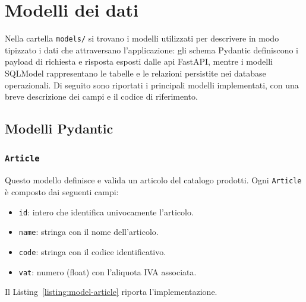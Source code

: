 \section{Modelli dei dati}
\label{sec:code-models}
Nella cartella \texttt{models/} si trovano i modelli utilizzati per descrivere in modo tipizzato i dati che attraversano l’applicazione: gli schema Pydantic definiscono i payload di richiesta e risposta esposti dalle \acrshort{api} FastAPI, mentre i modelli SQLModel rappresentano le tabelle e le relazioni persistite nei database operazionali. Di seguito sono riportati i principali modelli implementati, con una breve descrizione dei campi e il codice di riferimento.
\subsection{Modelli Pydantic}
\subsubsection{\texttt{Article}}
Questo modello definisce e valida un articolo del catalogo prodotti. Ogni \texttt{Article} è composto dai seguenti campi:
\begin{itemize}
    \item \texttt{id}: intero che identifica univocamente l’articolo.
    \item \texttt{name}: stringa con il nome dell’articolo.
    \item \texttt{code}: stringa con il codice identificativo.
    \item \texttt{vat}: numero (float) con l’aliquota IVA associata.
\end{itemize}
Il Listing~\ref{listing:model-article} riporta l’implementazione.

\begin{listing}[H]
\inputminted[fontsize=\small, breaklines, breakanywhere=true, linenos=true, bgcolor=gray!10]{python}{code/models/article.py}
\caption{Modello Pydantic \texttt{Article}.}
\label{listing:model-article}
\end{listing}

